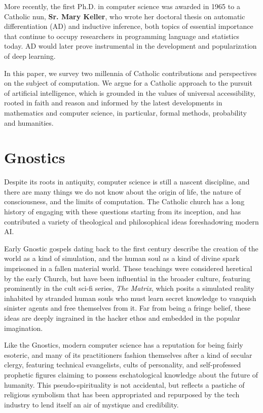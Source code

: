 \documentclass[sigplan,nonacm]{acmart}\settopmatter{printfolios=false,printccs=false,printacmref=false}
\begin{document}
  More recently, the first Ph.D. in computer science was awarded in 1965 to a Catholic nun, \textbf{Sr. Mary Keller}, who wrote her doctoral thesis on automatic differentiation (AD) and inductive inference, both topics of essential importance that continue to occupy researchers in programming language and statistics today. AD would later prove instrumental in the development and popularization of deep learning.

  In this paper, we survey two millennia of Catholic contributions and perspectives on the subject of computation. We argue for a Catholic approach to the pursuit of artificial intelligence, which is grounded in the values of universal accessibility, rooted in faith and reason and informed by the latest developments in mathematics and computer science, in particular, formal methods, probability and humanities.

 \section{Gnostics}

  Despite its roots in antiquity, computer science is still a nascent discipline, and there are many things we do not know about the origin of life, the nature of consciousness, and the limits of computation. The Catholic church has a long history of engaging with these questions starting from its inception, and has contributed a variety of theological and philosophical ideas foreshadowing modern AI.

  Early Gnostic gospels dating back to the first century describe the creation of the world as a kind of simulation, and the human soul as a kind of divine spark imprisoned in a fallen material world. These teachings were considered heretical by the early Church, but have been influential in the broader culture, featuring prominently in the cult sci-fi series, \textit{The Matrix}, which posits a simulated reality inhabited by stranded human souls who must learn secret knowledge to vanquish sinister agents and free themselves from it. Far from being a fringe belief, these ideas are deeply ingrained in the hacker ethos and embedded in the popular imagination.

  Like the Gnostics, modern computer science has a reputation for being fairly esoteric, and many of its practitioners fashion themselves after a kind of secular clergy, featuring technical evangelists, cults of personality, and self-professed prophetic figures claiming to possess eschatological knowledge about the future of humanity. This pseudo-spirituality is not accidental, but reflects a pastiche of religious symbolism that has been appropriated and repurposed by the tech industry to lend itself an air of mystique and credibility.
\end{document}
